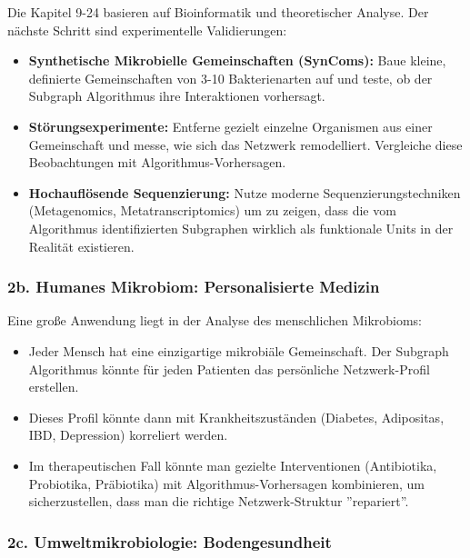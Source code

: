 \documentclass[a4paper,12pt]{article}
\theoremstyle{definition}
\begin{document}
Die Kapitel 9-24 basieren auf Bioinformatik und theoretischer Analyse. Der nächste Schritt sind experimentelle Validierungen:
\begin{itemize}
    \item \textbf{Synthetische Mikrobielle Gemeinschaften (SynComs):} Baue kleine, definierte Gemeinschaften von 3-10 Bakterienarten auf und teste, ob der Subgraph Algorithmus ihre Interaktionen vorhersagt.
    
    \item \textbf{Störungsexperimente:} Entferne gezielt einzelne Organismen aus einer Gemeinschaft und messe, wie sich das Netzwerk remodelliert. Vergleiche diese Beobachtungen mit Algorithmus-Vorhersagen.
    
    \item \textbf{Hochauflösende Sequenzierung:} Nutze moderne Sequenzierungstechniken (Metagenomics, Metatranscriptomics) um zu zeigen, dass die vom Algorithmus identifizierten Subgraphen wirklich als funktionale Units in der Realität existieren.
\end{itemize}

\subsubsection{2b. Humanes Mikrobiom: Personalisierte Medizin}

Eine große Anwendung liegt in der Analyse des menschlichen Mikrobioms:
\begin{itemize}
    \item Jeder Mensch hat eine einzigartige mikrobiäle Gemeinschaft. Der Subgraph Algorithmus könnte für jeden Patienten das persönliche Netzwerk-Profil erstellen.
    
    \item Dieses Profil könnte dann mit Krankheitszuständen (Diabetes, Adipositas, IBD, Depression) korreliert werden.
    
    \item Im therapeutischen Fall könnte man gezielte Interventionen (Antibiotika, Probiotika, Präbiotika) mit Algorithmus-Vorhersagen kombinieren, um sicherzustellen, dass man die richtige Netzwerk-Struktur ''repariert''.
\end{itemize}

\subsubsection{2c. Umweltmikrobiologie: Bodengesundheit}
\end{document}
